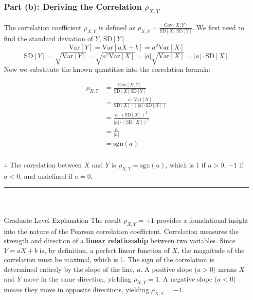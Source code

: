 \documentclass{article}
\begin{document}
\subsubsection*{Part (b): Deriving the Correlation $\rho_{X, Y}$}
\parbox{\textwidth}{
The correlation coefficient $\rho_{X, Y}$ is defined as $\rho_{X, Y} = \frac{\text{Cov}[X, Y]}{\text{SD}[X]\text{SD}[Y]}$. We first need to find the standard deviation of $Y$, $\text{SD}[Y]$.
$$ \text{Var}[Y] = \text{Var}[aX + b] = a^2 \text{Var}[X] $$
$$ \text{SD}[Y] = \sqrt{\text{Var}[Y]} = \sqrt{a^2 \text{Var}[X]} = |a|\sqrt{\text{Var}[X]} = |a| \cdot \text{SD}[X] $$
Now we substitute the known quantities into the correlation formula:
}
\begin{align*}
\rho_{X, Y} &= \frac{\text{Cov}[X, Y]}{\text{SD}[X]\text{SD}[Y]} \\
&= \frac{a \cdot \text{Var}[X]}{\text{SD}[X] \cdot (|a| \cdot \text{SD}[X])} \\
&= \frac{a \cdot (\text{SD}[X])^2}{|a| \cdot (\text{SD}[X])^2} \\
&= \frac{a}{|a|} \\
&= \text{sgn}(a)
\end{align*}

\subsubsection*{\normalfont}{$\therefore$ The correlation between $X$ and $Y$ is $\rho_{X, Y} = \text{sgn}(a)$, which is $1$ if $a>0$, $-1$ if $a<0$, and undefined if $a=0$.}


\noindent\rule{\textwidth}{0.4pt}\\

\newpage

\subsubsection*{\normalfont}{Graduate Level Explanation}
The result $\rho_{X, Y} = \pm 1$ provides a foundational insight into the nature of the Pearson correlation coefficient. Correlation measures the strength and direction of a \textbf{linear relationship} between two variables. Since $Y=aX+b$ is, by definition, a perfect linear function of $X$, the magnitude of the correlation must be maximal, which is 1. The sign of the correlation is determined entirely by the slope of the line, $a$. A positive slope ($a>0$) means $X$ and $Y$ move in the same direction, yielding $\rho_{X,Y}=1$. A negative slope ($a<0$) means they move in opposite directions, yielding $\rho_{X,Y}=-1$.
\end{document}
